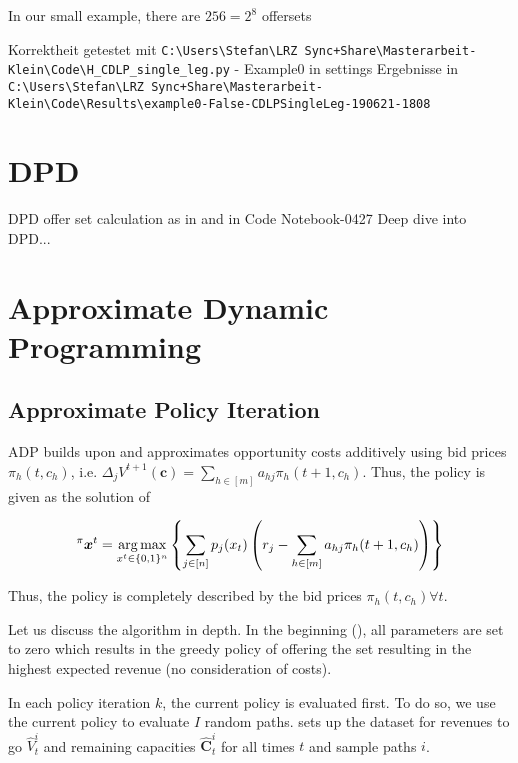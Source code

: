 In our small example, there are $256 = 2^8$ offersets

Korrektheit getestet mit \texttt{C:\textbackslash{}Users\textbackslash{}Stefan\textbackslash{}LRZ Sync+Share\textbackslash{}Masterarbeit-Klein\textbackslash{}Code\textbackslash{}H\_CDLP\_single\_leg.py} - Example0 in settings
Ergebnisse in \texttt{ C:\textbackslash{}Users\textbackslash{}Stefan\textbackslash{}LRZ Sync+Share\textbackslash{}Masterarbeit-Klein\textbackslash{}Code\textbackslash{}Results\textbackslash{}example0-False-CDLPSingleLeg-190621-1808}



\section{DPD}

DPD offer set calculation as in \cite{Bront.2009} and in Code Notebook-0427 Deep dive into DPD...

\section{Approximate Dynamic Programming}

\subsection{Approximate Policy Iteration}

ADP builds upon  and approximates opportunity costs additively using bid prices $\pi_h(t, c_h)$, i.e. $\Delta_j V^{t+1}(\boldsymbol{c}) = \sum_{h \in [m]} a_{hj}\pi_{h}(t+1, c_h)$. Thus, the policy is given as the solution of

\begin{align}
^\pi \boldsymbol{x}^t = \operatorname*{arg\,max}_{x^t \in \{0,1\}^n}\left\{ \sum_{j \in [n]} p_j(x_t) \left( r_j - \sum_{h \in [m]} a_{hj}\pi_{h}(t+1, c_h) \right) \right\} 
\end{align}

Thus, the policy is completely described by the bid prices $\pi_h(t, c_h) \forall t$.

Let us discuss the algorithm in depth. In the beginning (), all parameters are set to zero which results in the greedy policy of offering the set resulting in the highest expected revenue (no consideration of costs). 

In each policy iteration $k$, the current policy is evaluated first. To do so, we use the current policy to evaluate $I$ random paths.  sets up the dataset for revenues to go $\hat{V}_t^i$ and remaining capacities $\mathbf{\hat{C}}_t^i$ for all times $t$ and sample paths $i$. 

